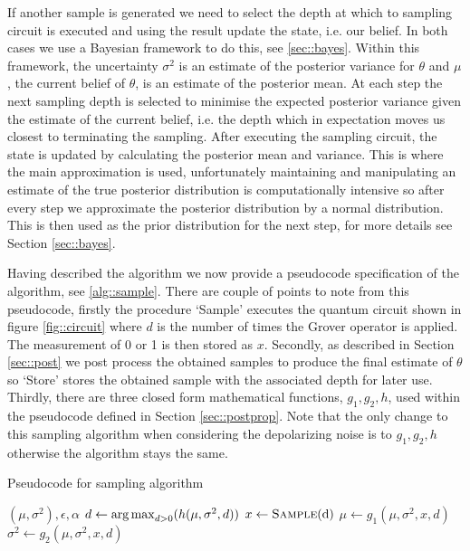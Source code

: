 If another sample is generated we need to select the depth at which to sampling circuit is executed and using the result update the state, i.e. our belief. In both cases we use a Bayesian framework to do this, see \ref{sec::bayes}. Within this framework, the uncertainty $\sigma^2$ is an estimate of the posterior variance for $\theta$ and $\mu$, the current belief of $\theta$, is an estimate of the posterior mean. At each step the next sampling depth is selected to minimise the expected posterior variance given the estimate of the current belief, i.e. the depth which in expectation moves us closest to terminating the sampling. After executing the sampling circuit, the state is updated by calculating the posterior mean and variance. This is where the main approximation is used, unfortunately maintaining and manipulating  an estimate of the true posterior distribution is computationally intensive so after every step we approximate the posterior distribution by a normal distribution. This is then used as the prior distribution for the next step, for more details see Section \ref{sec::bayes}.

Having described the algorithm we now provide a pseudocode specification of the algorithm, see \ref{alg::sample}. There are couple of points to note from this pseudocode, firstly the procedure `Sample' executes the quantum circuit shown in figure \ref{fig::circuit} where $d$ is the number of times the Grover operator is applied. The measurement of 0 or 1 is then stored as $x$. Secondly, as described in Section \ref{sec::post} we post process the obtained samples to produce the final estimate of $\theta$ so `Store' stores the obtained sample with the associated depth for later use.  Thirdly, there are three closed form mathematical functions, $g_1,g_2,h$, used within the pseudocode defined in Section \ref{sec::postprop}. Note that the only change to this sampling algorithm when considering the depolarizing noise is to $g_1,g_2,h$ otherwise the algorithm stays the same.

\begin{algorithm}
	\caption{Pseudocode for sampling algorithm }\label{alg::sample}
	\begin{algorithmic}
		\Require $(\mu, \sigma^2), \epsilon, \alpha$
		 
		\State $d \gets \operatorname*{arg\,max}_{d>0}(h(\mu,\sigma^2,d))$ 
		\State $x\gets \Call{Sample}{$d$}$
		\State $\mu \gets g_1(\mu,\sigma^2,x,d)$
		\State $\sigma^2 \gets g_2(\mu,\sigma^2,x,d)$ 
		\State {} 
		\EndWhile
	\end{algorithmic}
\end{algorithm}


